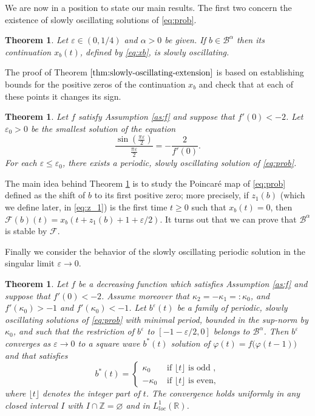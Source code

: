 \documentclass[a4paper,11pt]{article}
\theoremstyle{plain}
\newtheorem{theorem}[thm]{Theorem}
\theoremstyle{definition}
\theoremstyle{definition}
\numberwithin{equation}{section}
\begin{document}
We are now in a position to state our main results.  The first two concern the existence of slowly oscillating solutions of \eqref{eq:prob}. 
\begin{theorem}\label{thm:slowly-oscillating-extension}
	Let $\varepsilon\in (0, 1/4)$ and $\alpha>0$ be given. If $b\in \mathcal{B}^\alpha$ then its continuation $x_b(t)$, defined by \eqref{eq:xb}, is slowly oscillating. 
\end{theorem}
The proof of Theorem $\ref{thm:slowly-oscillating-extension}$ is based on establishing bounds for the positive zeros of the continuation $x_b$ and check that at each of these points it changes its sign.
\begin{theorem}\label{thm:existence-solutions}
    Let $f$ satisfy Assumption \ref{as:f} and suppose that $f'(0)<-2$.  Let $\varepsilon_0>0$ be the smallest solution of the equation 
    \begin{equation*}
	\dfrac{\sin\left(\frac{\pi\varepsilon}{2}\right)}{\frac{\pi\varepsilon}{2}} = -\frac{2}{f'(0)}. 
    \end{equation*}
    For each $\varepsilon\leq\varepsilon_0$, there exists a periodic, slowly oscillating solution of \eqref{eq:prob}. 
\end{theorem}
The main idea behind Theorem \ref{thm:existence-solutions} is to study the Poincaré map of \eqref{eq:prob} defined as the shift of $b$ to its first positive zero; more precisely, if $z_1(b)$ (which we define later, in \eqref{eq:z_1}) is the first time $t\geq 0$ such that $x_b(t)=0$,  then  $\mathcal{F}(b)(t)=x_b(t+z_1(b)+1+\varepsilon/2)$. It turns out that we can prove that $\mathcal{B}^\alpha $ is stable by $\mathcal{F}$.

Finally we  consider the behavior of the slowly oscillating periodic solution in the singular limit $\varepsilon\to 0$.
\begin{theorem}\label{thm:limit-behavior}
    Let $f$ be a decreasing function which satisfies Assumption \ref{as:f} and suppose that $f'(0)<-2$. Assume moreover that $\kappa_2=-\kappa_1=:\kappa_0$, and $f'(\kappa_0)>-1$ and $f'(\kappa_0)<-1$.  Let $b^{\varepsilon}(t)$ be a family of periodic, slowly oscillating solutions of \eqref{eq:prob} with minimal period, bounded in the sup-norm by $\kappa_0$, and such that the restriction of $b^\varepsilon$ to $[-1-\varepsilon/2, 0]$ belongs to $\mathcal{B}^\alpha$. Then $b^\varepsilon$ converges as $\varepsilon\to 0$ to a square wave $b^*(t)$ solution of $\varphi(t)=f\big(\varphi(t-1)\big)$ and that satisfies 
	\begin{equation*}
		b^*(t)= 
		\begin{cases}
			\kappa_0 & \text{ if }  \lfloor t\rfloor \text{ is odd },\\
			-\kappa_0 & \text{ if } \lfloor t\rfloor \text{ is even},
			\end{cases}
	\end{equation*}
	where $\lfloor t\rfloor$ denotes the integer part of $t$.
	The convergence holds uniformly in any closed interval  $I$ with $I\cap\mathbb{Z}=\varnothing$ and in  $L^1_{loc}(\mathbb{R})$.
\end{theorem}
\end{document}
